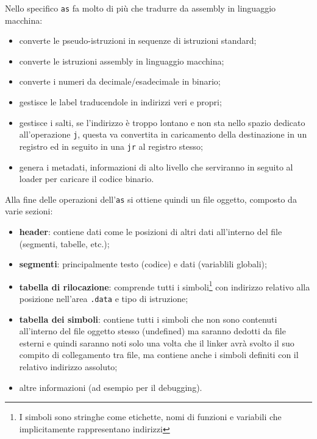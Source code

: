 \documentclass[class=book, crop=false, oneside]{standalone}
\begin{document}
Nello specifico \texttt{as} fa molto di più che tradurre da assembly in linguaggio macchina:
\begin{itemize}
	\item converte le pseudo-istruzioni in sequenze di istruzioni standard;
	\item converte le istruzioni assembly in linguaggio macchina;
	\item converte i numeri da decimale/esadecimale in binario;
	\item gestisce le label traducendole in indirizzi veri e propri;
	\item gestisce i salti, se l'indirizzo è troppo lontano e non sta nello spazio dedicato all'operazione \texttt{j}, questa va convertita in caricamento della destinazione in un registro ed in seguito in una \texttt{jr} al registro stesso;
	\item genera i metadati, informazioni di alto livello che serviranno in seguito al loader per caricare il codice binario.
\end{itemize}

Alla fine delle operazioni dell'\texttt{as} si ottiene quindi un file oggetto, composto da varie sezioni:
\begin{itemize}
	\item \textbf{header}: contiene dati come le posizioni di altri dati all'interno del file (segmenti, tabelle, etc.);
	\item \textbf{segmenti}: principalmente testo (codice) e dati (variablili globali);
	\item \textbf{tabella di rilocazione}: comprende tutti i simboli\footnote{I simboli sono stringhe come etichette, nomi di funzioni e variabili che implicitamente rappresentano indirizzi} con indirizzo relativo alla posizione nell'area \texttt{.data} e tipo di istruzione;
	\item \textbf{tabella dei simboli}: contiene tutti i simboli che non sono contenuti all'interno del file oggetto stesso (undefined) ma saranno dedotti da file esterni e quindi saranno noti solo una volta che il linker avrà svolto il suo compito di collegamento tra file, ma contiene anche i simboli definiti con il relativo indirizzo assoluto;
	\item altre informazioni (ad esempio per il debugging).
\end{itemize}
\end{document}
